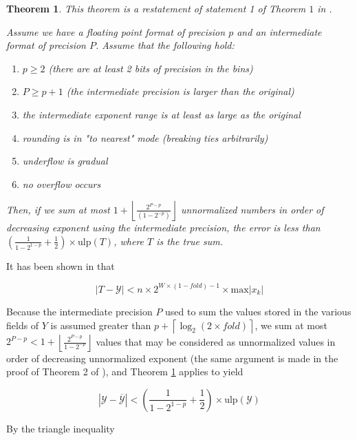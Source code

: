 \documentclass[12pt]{article}
\providecommand{\ceil}[1]{\left \lceil #1 \right \rceil }
\providecommand{\floor}[1]{\left \lfloor #1 \right \rfloor }
\providecommand{\max}{\ensuremath{\text{max}}}
\providecommand{\ulp}{\ensuremath{\text{ulp}}}
\theoremstyle{plain}
\newtheorem{thm}{Theorem}[section]
\begin{document}
    \begin{thm}
      This theorem is a restatement of statement 1 of Theorem $1$ in \cite{sortsum}.

      Assume we have a floating point format of precision $p$ and an intermediate format of precision $P$. Assume that the following hold:
      \begin{enumerate}
        \item $p \geq 2$ (there are at least 2 bits of precision in the bins)
        \item $P \geq p + 1$ (the intermediate precision is larger than the original)
        \item the intermediate exponent range is at least as large as the original
        \item rounding is in "to nearest" mode (breaking ties arbitrarily)
        \item underflow is gradual
        \item no overflow occurs
      \end{enumerate}
      Then, if we sum at most $1 + \floor{\frac{2^{P - p}}{(1 - 2^{-p})}}$ unnormalized numbers in order of decreasing exponent using the intermediate precision, the error is less than $(\frac{1}{1 - 2^{1 - p}} + \frac{1}{2})\times \ulp(T)$, where $T$ is the true sum.
      \label{thm:sortsum}
    \end{thm}

    It has been shown in \cite{repsum} that

    \begin{equation}
      \label{eq:repbound}
      |T - \mathcal{Y}| < n \times 2^{W \times (1 - fold) - 1} \times \max|x_k|
    \end{equation}

    Because the intermediate precision $P$ used to sum the values stored in the various fields of $Y$ is assumed greater than $p + \ceil{\log_2(2 \times fold)}$, we sum at most $2^{P - p} < 1 + \floor{\frac{2^{P - p}}{1 - 2^{-p}}}$ values that may be considered as unnormalized values in order of decreasing unnormalized exponent (the same argument is made in the proof of Theorem 2 of \cite{sortsum}), and Theorem \ref{thm:sortsum} applies to yield

    \begin{equation*}
      |\mathcal{Y} - \overline{\mathcal{Y}}| < (\frac{1}{1 - 2^{1 - p}} + \frac{1}{2})\times \ulp(\mathcal{Y})
    \end{equation*}

    By the triangle inequality
\end{document}
